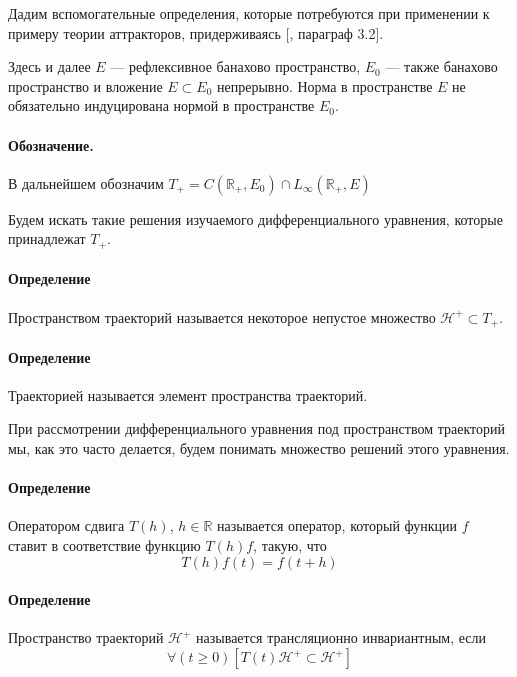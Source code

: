 
Дадим вспомогательные определения, которые потребуются при применении к примеру теории аттракторов,
придерживаясь [\cite{Zelenaya}, параграф 3.2].

Здесь и далее $E$ --- рефлексивное банахово пространство,
$E_0$ --- также банахово пространство и вложение $E \subset E_0$ непрерывно.
Норма в пространстве $E$ не обязательно индуцирована нормой в пространстве $E_0$.

\paragraph{Обозначение.}
В дальнейшем обозначим $T_+ = C(\mathbb{R}_+,E_0) \cap L_\infty(\mathbb{R}_+,E)$

Будем искать такие решения изучаемого дифференциального уравнения,
которые принадлежат $T_+$.


\paragraph{Определение}
Пространством траекторий называется некоторое непустое множество $\mathcal{H}^+ \subset T_+$.

\paragraph{Определение}
Траекторией называется элемент пространства траекторий.

При рассмотрении дифференциального уравнения под пространством траекторий мы, как это часто делается,
будем понимать множество решений этого уравнения.


\paragraph{Определение}
Оператором сдвига $T(h)$, $h\in\mathbb{R}$ называется оператор, который функции $f$ ставит в соответствие функцию $T(h)f$, такую, что
$$
T(h)f(t)=f(t+h)
$$


\paragraph{Определение}
Пространство траекторий $\mathcal{H}^+$ называется трансляционно инвариантным, если
$$
\forall(t \geq 0)\left[T(t)\mathcal{H}^+ \subset \mathcal{H}^+ \right]
$$

